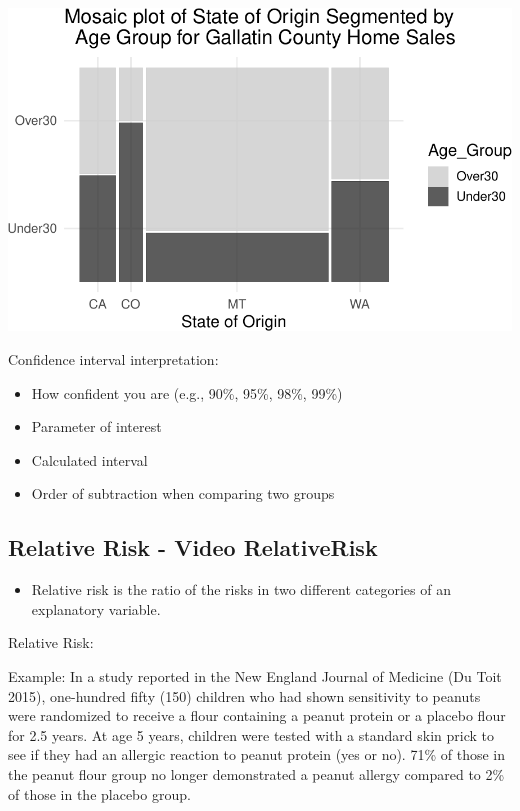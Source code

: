 \documentclass[
]{report}
\providecommand{\tightlist}{%
  \setlength{\itemsep}{0pt}\setlength{\parskip}{0pt}}
\begin{document}
\begin{center}\includegraphics[width=0.7\linewidth]{08-VN08-two-cat-simulation_files/figure-latex/unnamed-chunk-6-1} \end{center}

Confidence interval interpretation:

\begin{itemize}
\item
  How confident you are (e.g., 90\%, 95\%, 98\%, 99\%)
\item
  Parameter of interest
\item
  Calculated interval
\item
  Order of subtraction when comparing two groups
\end{itemize}

\vspace{0.8in}

\subsection*{Relative Risk - Video RelativeRisk}\label{relative-risk---video-relativerisk}

\begin{itemize}
\tightlist
\item
  Relative risk is the ratio of the risks in two different categories of an explanatory variable.
\end{itemize}

Relative Risk:

\vspace{0.3in}

Example: In a study reported in the New England Journal of Medicine (Du Toit 2015), one-hundred fifty (150) children who had shown sensitivity to peanuts were randomized to receive a flour containing a peanut protein or a placebo flour for 2.5 years. At age 5 years, children were tested with a standard skin prick to see if they had an allergic reaction to peanut protein (yes or no). 71\% of those in the peanut flour group no longer demonstrated a peanut allergy compared to 2\% of those in the placebo group.
\end{document}
